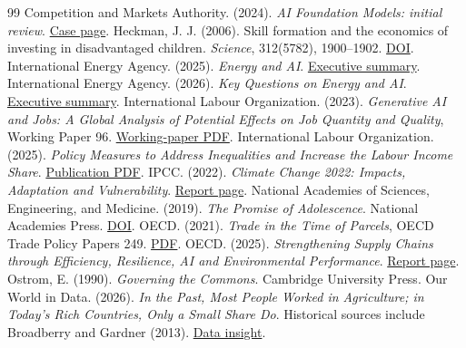 \documentclass[11pt]{article}
\begin{document}
\begin{thebibliography}{99}
\sloppy
{} Competition and Markets Authority. (2024). \emph{AI Foundation Models: initial review}. \href{https://www.gov.uk/cma-cases/ai-foundation-models-initial-review}{Case page}.
 Heckman, J. J. (2006). Skill formation and the economics of investing in disadvantaged children. \emph{Science}, 312(5782), 1900--1902. \href{https://doi.org/10.1126/science.1128898}{DOI}.
 International Energy Agency. (2025). \emph{Energy and AI}. \href{https://www.iea.org/reports/energy-and-ai/executive-summary}{Executive summary}.
 International Energy Agency. (2026). \emph{Key Questions on Energy and AI}. \href{https://www.iea.org/reports/key-questions-on-energy-and-ai/executive-summary}{Executive summary}.
 International Labour Organization. (2023). \emph{Generative AI and Jobs: A Global Analysis of Potential Effects on Job Quantity and Quality}, Working Paper 96. \href{https://www.ilo.org/sites/default/files/wcmsp5/groups/public/---dgreports/---inst/documents/publication/wcms_890761.pdf}{Working-paper PDF}.
 International Labour Organization. (2025). \emph{Policy Measures to Address Inequalities and Increase the Labour Income Share}. \href{https://researchrepository.ilo.org/view/pdfCoverPage?download=true&filePid=13138777410002676&instCode=41ILO_INST}{Publication PDF}.
 IPCC. (2022). \emph{Climate Change 2022: Impacts, Adaptation and Vulnerability}. \href{https://www.ipcc.ch/report/ar6/wg2/}{Report page}.
 National Academies of Sciences, Engineering, and Medicine. (2019). \emph{The Promise of Adolescence}. National Academies Press. \href{https://doi.org/10.17226/25388}{DOI}.
 OECD. (2021). \emph{Trade in the Time of Parcels}, OECD Trade Policy Papers 249. \href{https://www.oecd.org/content/dam/oecd/en/publications/reports/2021/05/trade-in-the-time-of-parcels_acf1943f/0faac348-en.pdf}{PDF}.
 OECD. (2025). \emph{Strengthening Supply Chains through Efficiency, Resilience, AI and Environmental Performance}. \href{https://www.oecd.org/en/publications/strengthening-supply-chains-through-efficiency-resilience-ai-and-environmental-performance_2a495d96-en.html}{Report page}.
 Ostrom, E. (1990). \emph{Governing the Commons}. Cambridge University Press.
 Our World in Data. (2026). \emph{In the Past, Most People Worked in Agriculture; in Today's Rich Countries, Only a Small Share Do}. Historical sources include Broadberry and Gardner (2013). \href{https://ourworldindata.org/data-insights/in-the-past-most-people-worked-in-agriculture-in-todays-rich-countries-only-a-small-share-do}{Data insight}.

\end{thebibliography}
\end{document}
